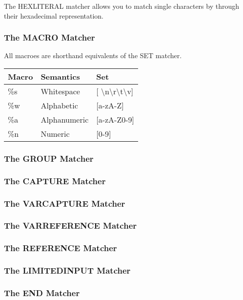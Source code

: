 The HEXLITERAL matcher allows you to match single characters by
through their hexadecimal representation.

\subsubsection{The MACRO Matcher}

All macroes are shorthand equivalents of the SET matcher.

\begin{center}
\caption{Naigama Macroes}
\label{tab:naig_macroes}
\begin{longtable}{lll}
\textbf{Macro} & \textbf{Semantics} & \textbf{Set} \\
\endhead
\%s & Whitespace & [ \textbackslash n\textbackslash r\textbackslash t\textbackslash v] \\
\%w & Alphabetic & [a-zA-Z] \\
\%a & Alphanumeric & [a-zA-Z0-9] \\
\%n & Numeric & [0-9] \\
\end{longtable}
\end{center}

\subsubsection{The GROUP Matcher}

\subsubsection{The CAPTURE Matcher}

\subsubsection{The VARCAPTURE Matcher}

\subsubsection{The VARREFERENCE Matcher}

\subsubsection{The REFERENCE Matcher}

\subsubsection{The LIMITEDINPUT Matcher}

\subsubsection{The END Matcher}

